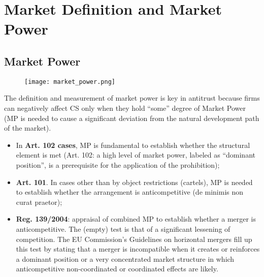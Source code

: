 \setcounter{chapter}{3}
\chapter{Market Definition and Market Power}
\vspace{-1.5cm}

{\chaptoc\noindent\begin{minipage}[inner sep=0,outer sep=0]{0.9\linewidth}\section{Market Power}\end{minipage}}

    \begin{figure}[h]
        \centering
        \texttt{[image: market\_power.png]}
    \end{figure}

    The definition and measurement of market power is key in antitrust because firms can negatively affect CS only when they hold “some” degree of Market Power (MP is needed to cause a significant deviation from the natural development path of the market).
    \begin{itemize}
        \item In \textbf{Art. 102 cases}, MP is fundamental to establish whether the structural element is met (Art. 102: a high level of market power, labeled as “dominant position”, is a prerequisite for the application of the prohibition);
        \item \textbf{Art. 101}. In cases other than by object restrictions (cartels), MP is needed to establish whether the arrangement is anticompetitive (de minimis non curat praetor);
        \item \textbf{Reg. 139/2004}: appraisal of combined MP to establish whether a merger is anticompetitive. The (empty) test is that of a significant lessening of competition. The EU Commission’s Guidelines on horizontal mergers fill up this test by stating that a merger is incompatible when it creates or reinforces a dominant position or a very concentrated market structure in which anticompetitive non-coordinated or coordinated effects are likely.
    \end{itemize}

